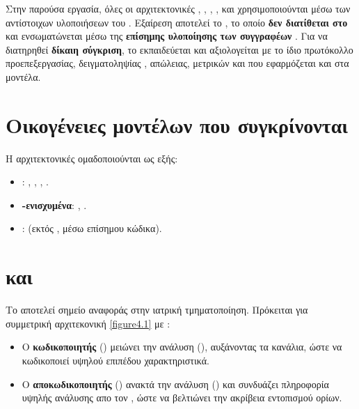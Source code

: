 Στην παρούσα εργασία, όλες οι αρχιτεκτονικές , , , 
,  και  χρησιμοποιούνται μέσω των αντίστοιχων υλοποιήσεων 
του  \cite{cardoso2022monai}. Εξαίρεση αποτελεί το , το οποίο \textbf{δεν διατίθεται στο } και ενσωματώνεται μέσω της \textbf{επίσημης υλοποίησης των συγγραφέων} 
\cite{xing2024segmamba,segmamba_github}. Για να διατηρηθεί \textbf{δίκαιη σύγκριση}, το  εκπαιδεύεται και αξιολογείται με το ίδιο πρωτόκολλο προεπεξεργασίας, 
δειγματοληψίας , απώλειας, 
μετρικών και  που εφαρμόζεται και στα μοντέλα.

\section{Οικογένειες μοντέλων που συγκρίνονται}
\label{sec:model_families}

Η αρχιτεκτονικές ομαδοποιούνται ως εξής:
\begin{itemize}
  \item \textbf{}: 
    , , , .
  \item \textbf{-ενισχυμένα}: 
    , .
  \item \textbf{}: 
     (εκτός , μέσω επίσημου κώδικα).
\end{itemize}

\section{ και }
\label{sec:unet}

Το  \cite{ronneberger2015unet} αποτελεί σημείο αναφοράς στην ιατρική τμηματοποίηση. Πρόκειται για συμμετρική αρχιτεκονική \ref{figure4.1}  με :
\begin{itemize}
  \item Ο \textbf{κωδικοποιητής} () μειώνει την ανάλυση (), 
        αυξάνοντας τα κανάλια, ώστε να κωδικοποιεί υψηλού επιπέδου χαρακτηριστικά.
  \item Ο \textbf{αποκωδικοποιητής} () ανακτά την ανάλυση () και συνδυάζει πληροφορία υψηλής ανάλυσης απο τον , ώστε να βελτιώνει την ακρίβεια εντοπισμού ορίων. 
\end{itemize}

